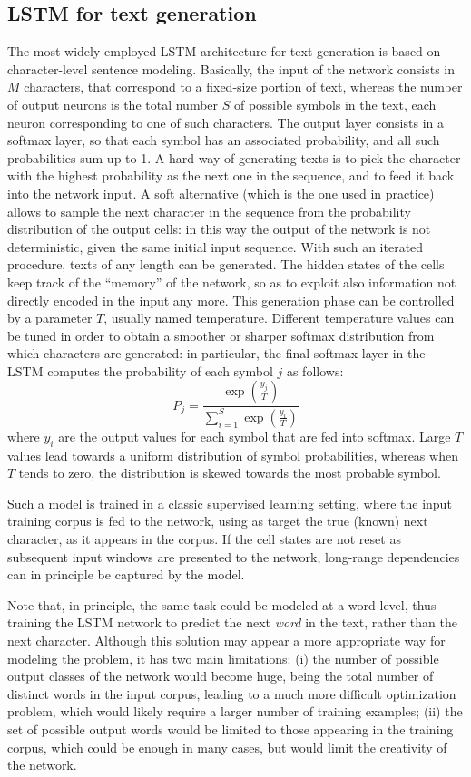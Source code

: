 \documentclass[journal]{IEEEtran}
\begin{document}
\subsection{LSTM for text generation}

The most widely employed LSTM architecture for text generation is based on character-level sentence modeling. Basically, the input of the network consists in $M$ characters, that correspond to a fixed-size portion of text, whereas the number of output neurons is the total number $S$ of possible symbols in the text, each neuron corresponding to one of such characters. The output layer consists in a softmax layer, so that each symbol has an associated probability, and all such probabilities sum up to 1. A hard way of generating texts is to pick the character with the highest probability as the next one in the sequence, and to feed it back into the network input. A soft alternative (which is the one used in practice) allows to sample the next character in the sequence from the probability distribution of the output cells: in this way the output of the network is not deterministic, given the same initial input sequence. With such an iterated procedure, texts of any length can be generated. The hidden states of the cells keep track of the ``memory'' of the network, so as to exploit also information not directly encoded in the input any more.
%
This generation phase can be controlled by a parameter $T$, usually named temperature. Different temperature values can be tuned in order to obtain a smoother or sharper softmax distribution from which characters are generated: in particular, the final softmax layer in the LSTM computes the probability of each symbol $j$ as follows:
\begin{equation}
  P_j = \frac{\exp(\frac{y_j}{T})}{\sum_{i=1}^S \exp(\frac{y_i}{T})}
\end{equation}
where $y_i$ are the output values for each symbol that are fed into softmax. Large $T$ values lead towards a uniform distribution of symbol probabilities, whereas when $T$ tends to zero, the distribution is skewed towards the most probable symbol.

Such a model is trained in a classic supervised learning setting, where the input training corpus is fed to the network, using as target the true (known) next character, as it appears in the corpus. If the cell states are not reset as subsequent input windows are presented to the network, long-range dependencies can in principle be captured by the model.

Note that, in principle, the same task could be modeled at a word level, thus training the LSTM network to predict the next \textit{word} in the text, rather than the next character. Although this solution may appear a more appropriate way for modeling the problem, it has two main limitations: (i) the number of possible output classes of the network would become huge, being the total number of distinct words in the input corpus, leading to a much more difficult optimization problem, which would likely require a larger number of training examples; (ii) the set of possible output words would be limited to those appearing in the training corpus, which could be enough in many cases, but would limit the creativity of the network.
\end{document}
